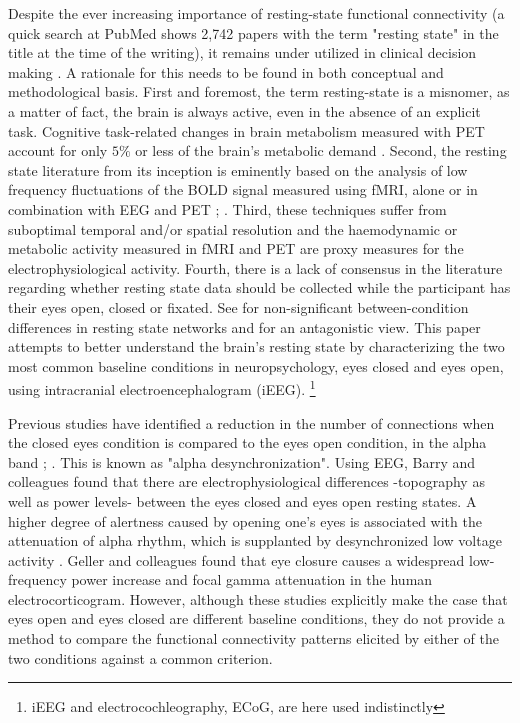 \documentclass[11pt, onecolumn]{article}
\begin{document}
Despite the ever increasing importance of resting-state functional connectivity (a quick search at PubMed shows 2,742 papers with the term "resting state" in the title at the time of the writing), it remains under utilized in clinical decision making \citep{tracy2015resting}.
A rationale for this needs to be found in both conceptual and methodological basis. First and foremost, the term resting-state is a misnomer, as a matter of fact, the brain is always active, even in the absence of an explicit task. Cognitive task-related changes in brain metabolism measured with PET account for only $5\%$ or less of the brain's metabolic demand \citep{sokoloff1955effect}. 
Second, the resting state literature from its inception is eminently based on the analysis of low frequency fluctuations of the BOLD signal measured using fMRI, alone or in combination with EEG and PET \citep{van2010exploring}; \citep{musso2010spontaneous}. Third, these techniques suffer from suboptimal temporal and/or spatial resolution and the haemodynamic or metabolic activity measured in fMRI and PET are proxy measures for the electrophysiological activity. Fourth, there is a lack of consensus in the literature regarding whether resting state data should be collected while the participant has their eyes open, closed or fixated. See \citep{patriat2013effect} for non-significant between-condition differences in resting state networks and \citep{yan2009spontaneous} for an antagonistic view. 
This paper attempts to better understand the brain's resting state by characterizing the two most common baseline conditions in neuropsychology, eyes closed and eyes open, using intracranial electroencephalogram (iEEG). \footnote{iEEG and electrocochleography, ECoG, are here used indistinctly}

Previous studies have identified a reduction in the number of connections when the closed eyes condition is compared to the eyes open condition, in the alpha band \citep{tan2013difference}; \citep{barry2007eeg}. This is known as  "alpha desynchronization". Using EEG, Barry and colleagues \citep{barry2007eeg} found that there are electrophysiological differences -topography as well as power levels- between the eyes closed and eyes open resting states.  
A higher degree of alertness caused by opening one's eyes is associated with the attenuation of alpha rhythm, which is supplanted by desynchronized low voltage activity \citep{niedermeyer2005electroencephalography}.
Geller and colleagues \citep{geller2014eye} found that eye closure causes a widespread low-frequency power increase and focal gamma attenuation in the human electrocorticogram. 
However, although these studies explicitly make the case that eyes open and eyes closed are different baseline conditions, they do not provide a method to compare the functional connectivity patterns elicited by either of the two conditions against a common criterion.
\end{document}
